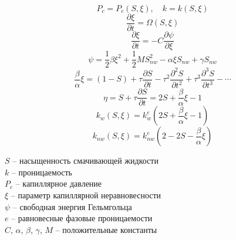 \documentclass[
	12pt
] {article}
\begin{document}
	\begin{equation}
        P_c = P_c(S, \xi), \quad k = k(S, \xi)
    \end{equation}
    \begin{equation} \label{eq:kondaurov-diff-equ}
        \frac{\partial \xi}{\partial t} = \Omega(S, \xi)
    \end{equation}
    \begin{equation} \label{eq:positive-dissipation-of-cap-energy}
        \frac{\partial \xi}{\partial t} = - C\frac{\partial \psi}{\partial \xi}
    \end{equation}
     \begin{equation} \label{eq:kondaurov-helmholtz}
        \psi = \frac{1}{2} \beta \xi^2 + \frac{1}{2} MS_{nw}^2 - \alpha \xi S_{nw} + \gamma S_{nw}
    \end{equation}
    \begin{equation}\label{eq:series}
        \frac{\beta}{\alpha}\xi = (1 - S) + \tau\frac{\partial S}{\partial t} - \tau^2\frac{\partial^2 S}{\partial t^2} + \tau^3\frac{\partial^3 S}{\partial t^3} - \cdots
    \end{equation}
    \begin{equation}
        \eta = S + \tau \frac{\partial S}{\partial t} = 2S + \frac{\beta}{\alpha} \xi - 1
    \end{equation}
    \begin{equation}
        k_w(S, \xi) = k_w^e(2S + \frac{\beta}{\alpha} \xi - 1)
    \end{equation}
    \begin{equation}
        k_{nw}(S, \xi) = k_{nw}^e(2 - 2S - \frac{\beta}{\alpha} \xi)
    \end{equation}

	\newpage
    $S$ -- насыщенность смачивающей жидкости \\
    $k$ -- проницаемость \\
    $P_c$ -- капиллярное давление \\
    $\xi$ -- параметр капиллярной неравновесности \\
    $\psi$ -- свободная энергия Гельмгольца \\
    $e$ -- равновесные фазовые проницаемости \\
    $C$, $\alpha$, $\beta$, $\gamma$, $M$ -- положительные константы \\
\end{document}
